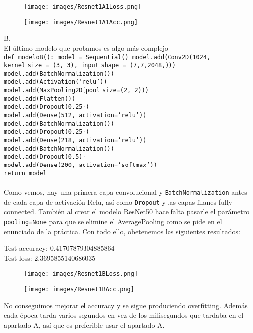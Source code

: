 \documentclass[12pt]{article}
\begin{document}
\begin{figure}[H]
\centering
\parbox{8cm}{
\texttt{[image: images/Resnet1A1Loss.png]}
\caption{}
\label{fig:2figsA}}
\begin{minipage}{8cm}
\texttt{[image: images/Resnet1A1Acc.png]}
\caption{}
\label{fig:2figsB}
\end{minipage}
\end{figure}
B.-\\
El último modelo que probamos es algo más complejo:\\
\texttt{def modeloB():
  model = Sequential()
  model.add(Conv2D(1024,\\
                     kernel$\_$size = (3, 3),
                     input$\_$shape = (7,7,2048,)))\\
  model.add(BatchNormalization())\\
  model.add(Activation('relu'))\\
  model.add(MaxPooling2D(pool$\_$size=(2, 2)))\\
  model.add(Flatten())\\
  model.add(Dropout(0.25))\\
  model.add(Dense(512, activation='relu'))\\
  model.add(BatchNormalization())\\
  model.add(Dropout(0.25))\\
  model.add(Dense(218, activation='relu'))\\
  model.add(BatchNormalization())\\
  model.add(Dropout(0.5))\\
  model.add(Dense(200, activation='softmax'))\\
  return model}
\\\\Como vemos, hay una primera capa convolucional y \texttt{BatchNormalization} antes de cada capa de activación Relu, así como \texttt{Dropout} y las capas filanes fully-connected. También al crear el modelo ResNet50 hace falta pasarle el parámetro \texttt{pooling=None} para que se elimine el AveragePooling como se pide en el enunciado de la práctica. Con todo ello, obetenemos los siguientes resultados:\\
\begin{center}
Test accuracy: 0.41707879304885864\\
Test loss: 2.3695855140686035\\
\end{center}
\begin{figure}[H]
\centering
\parbox{8cm}{
\texttt{[image: images/Resnet1BLoss.png]}
\caption{}
\label{fig:2figsA}}
\begin{minipage}{8cm}
\texttt{[image: images/Resnet1BAcc.png]}
\caption{}
\label{fig:2figsB}
\end{minipage}
\end{figure}
No conseguimos mejorar el accuracy y se sigue produciendo overfitting. Además cada época tarda varios segundos en vez de los milisegundos que tardaba en el apartado A, así que es preferible usar el apartado A.
\end{document}
